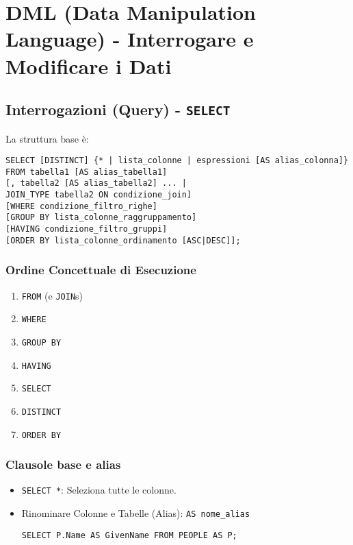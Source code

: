 \vspace{0.5em}
\noindent
{}

\section{DML (Data Manipulation Language) - Interrogare e Modificare i Dati}

\subsection{Interrogazioni (Query) - \texttt{SELECT}}
La struttura base è:
\begin{verbatim}
SELECT [DISTINCT] {* | lista_colonne | espressioni [AS alias_colonna]}
FROM tabella1 [AS alias_tabella1]
[, tabella2 [AS alias_tabella2] ... |
JOIN_TYPE tabella2 ON condizione_join]
[WHERE condizione_filtro_righe]
[GROUP BY lista_colonne_raggruppamento]
[HAVING condizione_filtro_gruppi]
[ORDER BY lista_colonne_ordinamento [ASC|DESC]];
\end{verbatim}

\subsubsection{Ordine Concettuale di Esecuzione}
\begin{enumerate}
	\item \texttt{FROM} (e \texttt{JOIN}s)
	\item \texttt{WHERE}
	\item \texttt{GROUP BY}
	\item \texttt{HAVING}
	\item \texttt{SELECT}
	\item \texttt{DISTINCT}
	\item \texttt{ORDER BY}
\end{enumerate}

\subsubsection{Clausole base e alias}
\begin{itemize}
	\item \texttt{SELECT *}: Seleziona tutte le colonne.
	\item Rinominare Colonne e Tabelle (Alias): \texttt{AS nome\_alias}
	\begin{verbatim}
SELECT P.Name AS GivenName FROM PEOPLE AS P;
	\end{verbatim}
\end{itemize}

